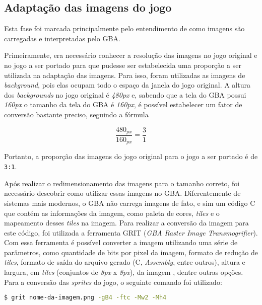 \subsection{Adaptação das imagens do jogo}

Esta fase foi marcada principalmente pelo entendimento de como imagens são carregadas e interpretadas pelo GBA.

Primeiramente, era necessário conhecer a resolução das imagens no jogo original e no jogo a ser portado para que pudesse ser estabelecida uma proporção a ser utilizada na adaptação das imagens. Para isso, foram utilizadas as imagens de \textit{background}, pois elas ocupam todo o espaço da janela do jogo original. A altura dos \textit{backgrounds} no jogo original é \textit{480px} e, sabendo que a tela do GBA possui \textit{160px} o tamanho da tela do GBA é \textit{160px}, é possível estabelecer um fator de conversão bastante preciso, seguindo a fórmula

\begin{equation}
\label{Cálculo da proporção das imagens do jogo}
\frac{480_{px}}{160_{px}} = \frac{3}{1}
\end{equation}

Portanto, a proporção das imagens do jogo original para o jogo a ser portado é de \texttt{3:1}.

Após realizar o redimensionamento das imagens para o tamanho correto, foi necessário descobrir como utilizar essas imagens no GBA. Diferentemente de sistemas mais modernos, o GBA não carrega imagens de fato, e sim um código C que contém as informações da imagem, como paleta de cores, \textit{tiles} e o mapeamento desses \textit{tiles} na imagem. Para realizar a conversão da imagem para este código, foi utilizada a ferramenta GRIT (\textit{GBA Raster Image Transmogrifier}). Com essa ferramenta é possível converter a imagem utilizando uma série de parâmetros, como quantidade de bits por pixel da imagem, formato de redução de \textit{tiles}, formato de saída do arquivo gerado (C, \textit{Assembly}, entre outros), altura e largura, em \textit{tiles} (conjuntos de \textit{8px} x \textit{8px}), da imagem , dentre outras opções. Para a conversão das \textit{sprites} do jogo, o seguinte comando foi utilizado:

\begin{lstlisting}[language=bash,caption={Comando para conversão das imagens em código/}]
$ grit nome-da-imagem.png -gB4 -ftc -Mw2 -Mh4
\end{lstlisting}


